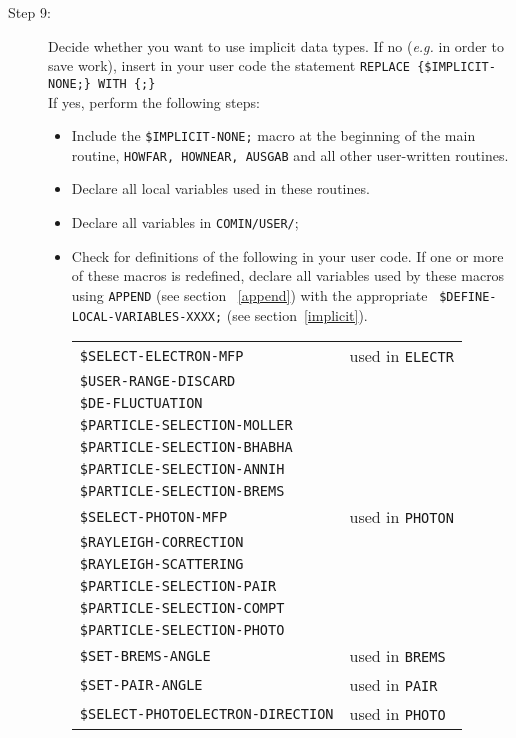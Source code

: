 \begin{description}
\item[Step 9:]
Decide whether you want to use implicit data types. 
If no ({\em e.g.} in order to save work), insert in 
your user code the statement
{\tt REPLACE \{\$IMPLICIT-NONE;\} WITH \{;\} }\\
If yes, perform the following steps:
\begin{itemize}
\item
Include the {\tt \$IMPLICIT-NONE;} macro at the beginning 
of the main routine, {\tt HOWFAR, HOWNEAR, AUSGAB} and 
all other user-written routines.
\item
Declare all local variables used in these routines.
\item
Declare all variables in {\tt COMIN/USER/};
\item
Check for definitions of the following
in your user code. If one or more of these macros is redefined,  
declare all variables used by these macros using {\tt APPEND} 
(see section ~\ref{append}) with the appropriate {\tt
\$DEFINE-LOCAL-VARIABLES-XXXX;} (see section~\ref{implicit}).\\
\begin{tabular}{ll}
{\tt \$SELECT-ELECTRON-MFP}  &  used in {\tt ELECTR} \\
{\tt \$USER-RANGE-DISCARD} & \\
{\tt \$DE-FLUCTUATION} & \\
{\tt \$PARTICLE-SELECTION-MOLLER} & \\
{\tt \$PARTICLE-SELECTION-BHABHA} & \\
{\tt \$PARTICLE-SELECTION-ANNIH} & \\
{\tt \$PARTICLE-SELECTION-BREMS} & \\
{\tt \$SELECT-PHOTON-MFP} & used in {\tt PHOTON}\\
{\tt \$RAYLEIGH-CORRECTION} & \\
{\tt \$RAYLEIGH-SCATTERING} & \\
{\tt \$PARTICLE-SELECTION-PAIR} & \\
{\tt \$PARTICLE-SELECTION-COMPT} & \\
{\tt \$PARTICLE-SELECTION-PHOTO} & \\
{\tt \$SET-BREMS-ANGLE} & used in {\tt BREMS} \\
{\tt \$SET-PAIR-ANGLE} & used in {\tt PAIR} \\
{\tt \$SELECT-PHOTOELECTRON-DIRECTION} & used in {\tt PHOTO} \\
\end{tabular}
\end{itemize}


\end{description}
